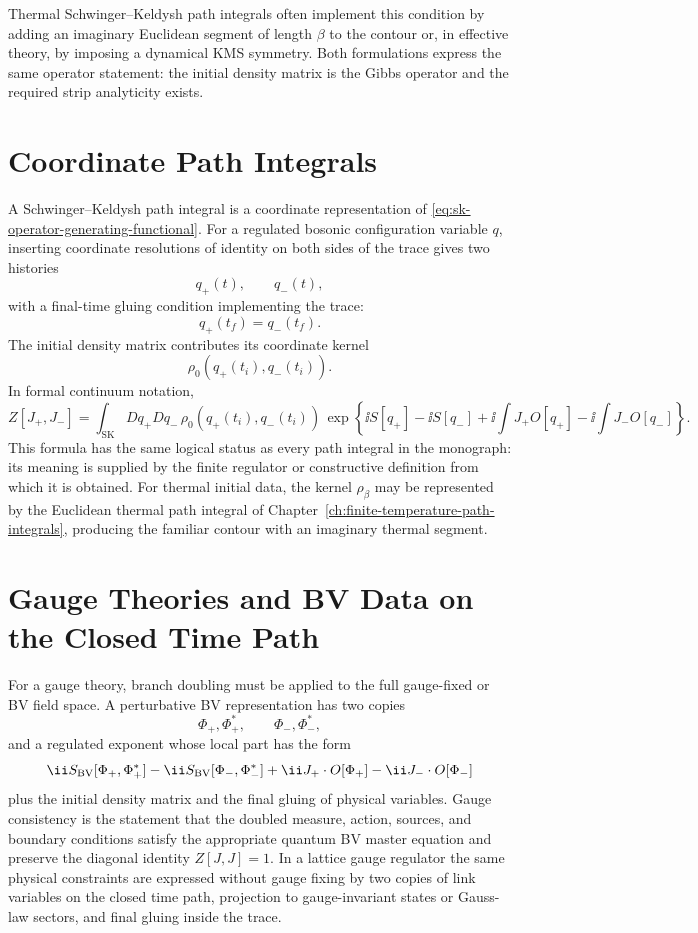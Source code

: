 Thermal Schwinger--Keldysh path integrals often implement this condition by
adding an imaginary Euclidean segment of length \(\beta\) to the contour or,
in effective theory, by imposing a dynamical KMS symmetry.  Both
formulations express the same operator statement: the initial density matrix
is the Gibbs operator and the required strip analyticity exists.

\section{Coordinate Path Integrals}

A Schwinger--Keldysh path integral is a coordinate representation of
\eqref{eq:sk-operator-generating-functional}.  For a regulated bosonic
configuration variable \(q\), inserting coordinate resolutions of identity
on both sides of the trace gives two histories
\[
  q_+(t),\qquad q_-(t),
\]
with a final-time gluing condition implementing the trace:
\[
  q_+(t_f)=q_-(t_f).
\]
The initial density matrix contributes its coordinate kernel
\[
  \rho_0(q_+(t_i),q_-(t_i)).
\]
In formal continuum notation,
\[
  Z[J_+,J_-]
  =
  \int_{\mathrm{SK}}Dq_+Dq_-\,
  \rho_0(q_+(t_i),q_-(t_i))\,
  \exp\!\left\{
  \ii S[q_+]-\ii S[q_-]
  +\ii\int J_+O[q_+]-\ii\int J_-O[q_-]
  \right\}.
\]
This formula has the same logical status as every path integral in the
monograph: its meaning is supplied by the finite regulator or constructive
definition from which it is obtained.  For thermal initial data, the kernel
\(\rho_\beta\) may be represented by the Euclidean thermal path integral of
Chapter~\ref{ch:finite-temperature-path-integrals}, producing the familiar
contour with an imaginary thermal segment.

\section{Gauge Theories and BV Data on the Closed Time Path}

For a gauge theory, branch doubling must be applied to the full gauge-fixed
or BV field space.  A perturbative BV representation has two copies
\[
  \Phi_+,\Phi_+^*,
  \qquad
  \Phi_-,\Phi_-^*,
\]
and a regulated exponent whose local part has the form
\[
  \ii S_{\rm BV}[\Phi_+,\Phi_+^*]
  -
  \ii S_{\rm BV}[\Phi_-,\Phi_-^*]
  +
  \ii J_+\cdot O[\Phi_+]
  -
  \ii J_-\cdot O[\Phi_-]
\]
plus the initial density matrix and the final gluing of physical variables.
Gauge consistency is the statement that the doubled measure, action, sources,
and boundary conditions satisfy the appropriate quantum BV master equation
and preserve the diagonal identity \(Z[J,J]=1\).  In a lattice gauge
regulator the same physical constraints are expressed without gauge fixing by
two copies of link variables on the closed time path, projection to
gauge-invariant states or Gauss-law sectors, and final gluing inside the
trace.

